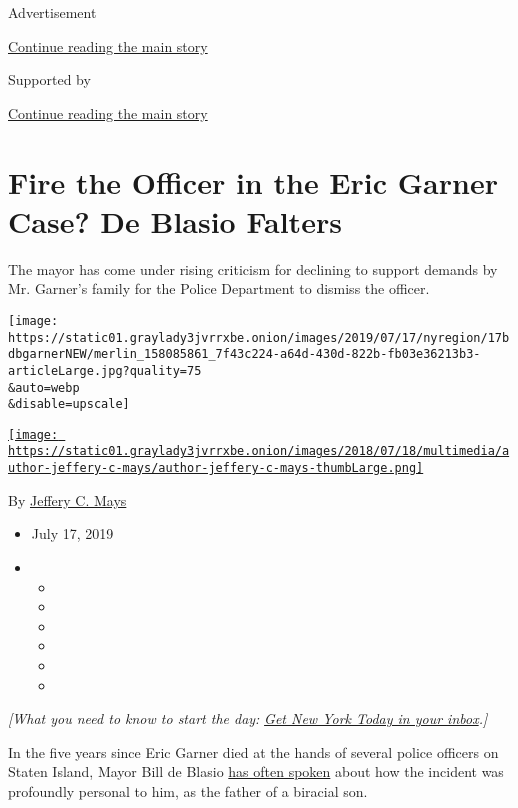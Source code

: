 Advertisement

\protect\hyperlink{after-top}{Continue reading the main story}

Supported by

\protect\hyperlink{after-sponsor}{Continue reading the main story}

\hypertarget{fire-the-officer-in-the-eric-garner-case-de-blasio-falters}{%
\section{Fire the Officer in the Eric Garner Case? De Blasio
Falters}\label{fire-the-officer-in-the-eric-garner-case-de-blasio-falters}}

The mayor has come under rising criticism for declining to support
demands by Mr. Garner's family for the Police Department to dismiss the
officer.

\texttt{[image: https://static01.graylady3jvrrxbe.onion/images/2019/07/17/nyregion/17bdbgarnerNEW/merlin\_158085861\_7f43c224-a64d-430d-822b-fb03e36213b3-articleLarge.jpg?quality=75\\\&auto=webp\\\&disable=upscale]}

\href{https://www.nytimes3xbfgragh.onion/by/jeffery-c-mays}{\texttt{[image: https://static01.graylady3jvrrxbe.onion/images/2018/07/18/multimedia/author-jeffery-c-mays/author-jeffery-c-mays-thumbLarge.png]}}

By \href{https://www.nytimes3xbfgragh.onion/by/jeffery-c-mays}{Jeffery
C. Mays}

\begin{itemize}
\item
  July 17, 2019
\item
  \begin{itemize}
  \item
  \item
  \item
  \item
  \item
  \item
  \end{itemize}
\end{itemize}

\emph{{[}What you need to know to start the day:}
\href{https://www.nytimes3xbfgragh.onion/newsletters/newyorktoday?module=inline}{\emph{Get
New York Today in your inbox}}\emph{.{]}}

In the five years since Eric Garner died at the hands of several police
officers on Staten Island, Mayor Bill de Blasio
\href{https://www.nytimes3xbfgragh.onion/2015/07/15/nyregion/mayor-de-blasio-seeks-to-strike-a-balance-at-memorial-for-eric-garner.html}{has
often spoken} about how the incident was profoundly personal to him, as
the father of a biracial son.

